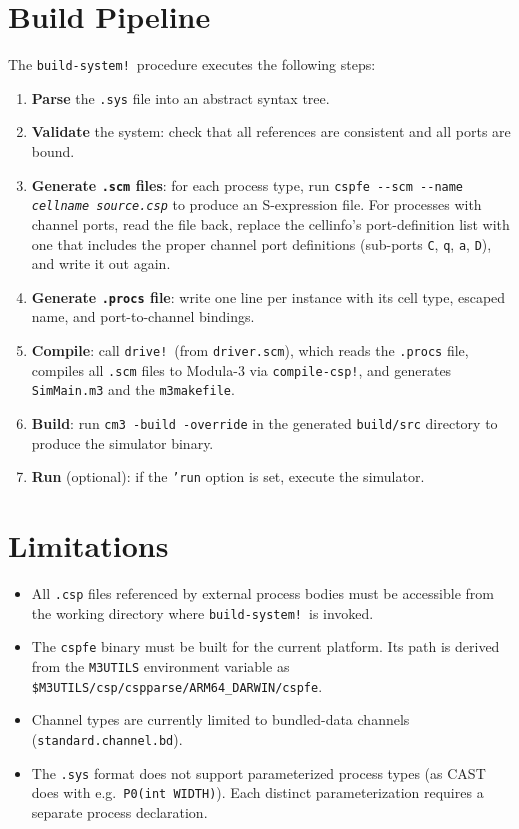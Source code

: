 \documentclass[11pt]{article}
\newcommand{\nonterminal}[1]{\textit{#1}}
\begin{document}
\section{Build Pipeline}

The \texttt{build-system!}\ procedure executes the following steps:

\begin{enumerate}
\item \textbf{Parse} the \texttt{.sys} file into an abstract syntax tree.
\item \textbf{Validate} the system: check that all references are
  consistent and all ports are bound.
\item \textbf{Generate \texttt{.scm} files}: for each process type,
  run \texttt{cspfe -{}-scm -{}-name \nonterminal{cellname}
  \nonterminal{source.csp}} to produce an S-expression file.
  For processes with channel ports, read the file back, replace the
  cellinfo's port-definition list with one that includes the proper
  channel port definitions (sub-ports \texttt{C}, \texttt{q},
  \texttt{a}, \texttt{D}), and write it out again.
\item \textbf{Generate \texttt{.procs} file}: write one line per
  instance with its cell type, escaped name, and port-to-channel
  bindings.
\item \textbf{Compile}: call \texttt{drive!}\ (from
  \texttt{driver.scm}), which reads the \texttt{.procs} file,
  compiles all \texttt{.scm} files to Modula-3 via
  \texttt{compile-csp!}, and generates \texttt{SimMain.m3} and the
  \texttt{m3makefile}.
\item \textbf{Build}: run \texttt{cm3 -build -override} in the
  generated \texttt{build/src} directory to produce the simulator
  binary.
\item \textbf{Run} (optional): if the \texttt{'run} option is set,
  execute the simulator.
\end{enumerate}

\section{Limitations}

\begin{itemize}
\item All \texttt{.csp} files referenced by external process bodies
  must be accessible from the working directory where
  \texttt{build-system!}\ is invoked.
\item The \texttt{cspfe} binary must be built for the current platform.
  Its path is derived from the \texttt{M3UTILS} environment variable
  as \texttt{\$M3UTILS/csp/cspparse/ARM64\_DARWIN/cspfe}.
\item Channel types are currently limited to bundled-data channels
  (\texttt{standard.channel.bd}).
\item The \texttt{.sys} format does not support parameterized process
  types (as CAST does with e.g.\ \texttt{P0(int WIDTH)}).
  Each distinct parameterization requires a separate process
  declaration.
\end{itemize}
\end{document}
